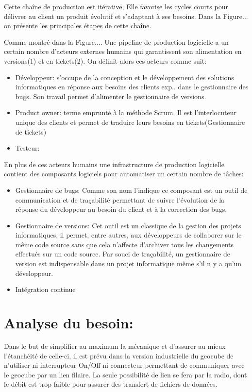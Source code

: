 \documentclass{themeensg}
\begin{document}
Cette chaîne de production est itérative, Elle favorise les cycles courts pour délivrer au client un produit évolutif et s'adaptant à ses besoins. Dans la Figure... on présente les principales étapes de cette chaîne.

Comme montré dans la Figure.... Une pipeline de production logicielle a un certain nombre d'acteurs externes humains qui garantissent son alimentation en versions(1) et en tickets(2). On définit alors ces acteurs comme suit:

\begin{itemize}
\item Développeur: s'occupe de la conception et le développement des solutions informatiques en réponse aux besoins des clients exp.. dans le gestionnaire des bugs. Son travail permet d'alimenter le gestionnaire de versions.
\item Product owner: terme emprunté à la méthode Scrum. Il est l'interlocuteur unique des clients et permet de traduire leurs besoins en tickets(Gestionnaire de tickets)
\item Testeur: 
\end{itemize}
En plus de ces acteurs humains une infrastructure de production logicielle contient des composants logiciels pour automatiser un certain nombre de tâches:
\begin{itemize}
\item Gestionnaire de bugs: Comme son nom l'indique ce composant est un outil de communication et de traçabilité permettant de suivre l'évolution de la réponse du développeur au besoin du client et à la correction des bugs.
\item Gestionnaire de versions: Cet outil est un classique de la gestion des projets informatiques, il permet, entre autres, aux développeurs de collaborer sur le même code source sans que cela n'affecte  d'archiver tous les changements effectués sur un code source. Par souci de traçabilité, un gestionnaire de version est indispensable dans un projet informatique même s'il n y a qu'un développeur.
\item Intégration continue
\end{itemize}



\section{Analyse du besoin:}
Dans le but de simplifier au maximum la mécanique et d’assurer au mieux l’étanchéité de celle-ci, il est prévu dans la version industrielle du geocube de n’utiliser ni interrupteur On/Off ni connecteur permettant de communiquer avec le geocube par un lien filaire. La seule possibilité de lien se fera par la radio, dont le débit est trop faible pour assurer des transfert de fichiers de données.
\end{document}
